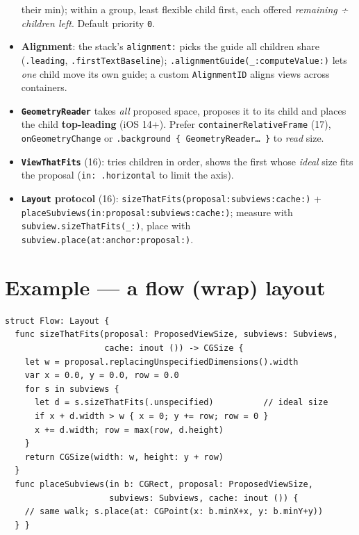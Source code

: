 \documentclass[8pt]{extarticle}
\begin{document}
\begin{multicols}{2}
\begin{itemize}
        their min); within a group, least flexible child first, each offered
        \emph{remaining ÷ children left}\unverified. Default priority \texttt{0}.
  \item \textbf{Alignment}: the stack's \texttt{alignment:} picks the guide all children share
        (\texttt{.leading}, \texttt{.firstTextBaseline}); \texttt{.alignmentGuide(\_:computeValue:)} lets
        \emph{one} child move its own guide; a custom \texttt{AlignmentID} aligns views across containers.
  \item \textbf{\texttt{GeometryReader}} takes \emph{all} proposed space, proposes it to its child and
        places the child \textbf{top-leading} (iOS 14+). Prefer \texttt{containerRelativeFrame} (17),
        \texttt{onGeometryChange} or \texttt{.background \{ GeometryReader… \}} to \emph{read} size.
  \item \textbf{\texttt{ViewThatFits}} (16): tries children in order, shows the first whose \emph{ideal}
        size fits the proposal (\texttt{in: .horizontal} to limit the axis).
  \item \textbf{\texttt{Layout} protocol} (16): \texttt{sizeThatFits(proposal:subviews:cache:)} +
        \texttt{placeSubviews(in:proposal:subviews:cache:)}; measure with
        \texttt{subview.sizeThatFits(\_:)}, place with \texttt{subview.place(at:anchor:proposal:)}.
\end{itemize}

\section{Example — a flow (wrap) layout}
\begin{lstlisting}[language=SwiftSheet]
struct Flow: Layout {
  func sizeThatFits(proposal: ProposedViewSize, subviews: Subviews,
                    cache: inout ()) -> CGSize {
    let w = proposal.replacingUnspecifiedDimensions().width
    var x = 0.0, y = 0.0, row = 0.0
    for s in subviews {
      let d = s.sizeThatFits(.unspecified)          // ideal size
      if x + d.width > w { x = 0; y += row; row = 0 }
      x += d.width; row = max(row, d.height)
    }
    return CGSize(width: w, height: y + row)
  }
  func placeSubviews(in b: CGRect, proposal: ProposedViewSize,
                     subviews: Subviews, cache: inout ()) {
    // same walk; s.place(at: CGPoint(x: b.minX+x, y: b.minY+y))
  } }
\end{lstlisting}

\columnbreak


\end{multicols}
\end{document}
